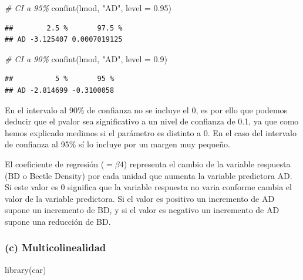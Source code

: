 \documentclass[
]{article}
\newenvironment{Shaded}{\begin{snugshade}}{\end{snugshade}}
\newcommand{\AttributeTok}[1]{\textcolor[rgb]{0.77,0.63,0.00}{#1}}
\newcommand{\CommentTok}[1]{\textcolor[rgb]{0.56,0.35,0.01}{\textit{#1}}}
\newcommand{\FloatTok}[1]{\textcolor[rgb]{0.00,0.00,0.81}{#1}}
\newcommand{\FunctionTok}[1]{\textcolor[rgb]{0.00,0.00,0.00}{#1}}
\newcommand{\NormalTok}[1]{#1}
\newcommand{\StringTok}[1]{\textcolor[rgb]{0.31,0.60,0.02}{#1}}
\begin{document}
\begin{Shaded}
\begin{Highlighting}[]
\CommentTok{\# CI a 95\%}
\FunctionTok{confint}\NormalTok{(lmod, }\StringTok{"AD"}\NormalTok{, }\AttributeTok{level =} \FloatTok{0.95}\NormalTok{)}
\end{Highlighting}
\end{Shaded}

\begin{verbatim}
##        2.5 %       97.5 %
## AD -3.125407 0.0007019125
\end{verbatim}

\begin{Shaded}
\begin{Highlighting}[]
\CommentTok{\# CI a 90\%}
\FunctionTok{confint}\NormalTok{(lmod, }\StringTok{"AD"}\NormalTok{, }\AttributeTok{level =} \FloatTok{0.9}\NormalTok{)}
\end{Highlighting}
\end{Shaded}

\begin{verbatim}
##          5 %       95 %
## AD -2.814699 -0.3100058
\end{verbatim}

En el intervalo al 90\% de confianza no se incluye el 0, es por ello que
podemos deducir que el pvalor sea significativo a un nivel de confianza
de 0.1, ya que como hemos explicado medimos si el parámetro es distinto
a 0. En el caso del intervalo de confianza al 95\% sí lo incluye por un
margen muy pequeño.

El coeficiente de regresión (\(=\beta4\)) representa el cambio de la
variable respuesta (BD o Beetle Density) por cada unidad que aumenta la
variable predictora AD. Si este valor es 0 significa que la variable
respuesta no varia conforme cambia el valor de la variable predictora.
Si el valor es positivo un incremento de AD supone un incremento de BD,
y si el valor es negativo un incremento de AD supone una reducción de
BD.

\hypertarget{c-multicolinealidad}{%
\subsubsection{(c) Multicolinealidad}\label{c-multicolinealidad}}

\begin{Shaded}
\begin{Highlighting}[]
\FunctionTok{library}\NormalTok{(car)}
\end{Highlighting}
\end{Shaded}
\end{document}
